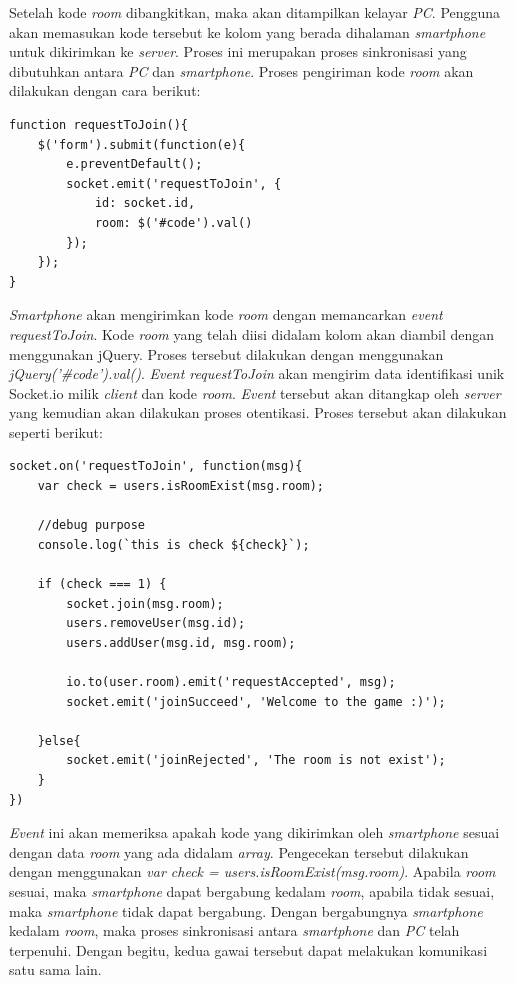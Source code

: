 \begin{enumerate}
\begin{itemize}
		Setelah kode \textit{room} dibangkitkan, maka akan ditampilkan kelayar \textit{PC}. Pengguna akan memasukan kode tersebut ke kolom yang berada dihalaman \textit{smartphone} untuk dikirimkan ke \textit{server}. Proses ini merupakan proses sinkronisasi yang dibutuhkan antara \textit{PC} dan \textit{smartphone}. Proses pengiriman kode \textit{room} akan dilakukan dengan cara berikut:
\begin{lstlisting}
function requestToJoin(){
	$('form').submit(function(e){
		e.preventDefault();
		socket.emit('requestToJoin', {
			id: socket.id,
			room: $('#code').val()
		});
	});
}
\end{lstlisting}
		\textit{Smartphone} akan mengirimkan kode \textit{room} dengan memancarkan \textit{event requestToJoin}. Kode \textit{room} yang telah diisi didalam kolom akan diambil dengan menggunakan jQuery. Proses tersebut dilakukan dengan menggunakan \textit{jQuery('\#code').val()}. \textit{Event requestToJoin} akan mengirim data identifikasi unik Socket.io milik \textit{client} dan kode \textit{room}. \textit{Event} tersebut akan ditangkap oleh \textit{server} yang kemudian akan dilakukan proses otentikasi. Proses tersebut akan dilakukan seperti berikut:
\begin{lstlisting}[caption={Proses otentikasi}, label={lst:otentikasi},captionpos=b]
socket.on('requestToJoin', function(msg){
	var check = users.isRoomExist(msg.room);

	//debug purpose
	console.log(`this is check ${check}`);

	if (check === 1) {
		socket.join(msg.room);
		users.removeUser(msg.id);
		users.addUser(msg.id, msg.room);

		io.to(user.room).emit('requestAccepted', msg);
		socket.emit('joinSucceed', 'Welcome to the game :)');

	}else{
		socket.emit('joinRejected', 'The room is not exist');
	}
})
\end{lstlisting}
		\textit{Event} ini akan memeriksa apakah kode yang dikirimkan oleh \textit{smartphone} sesuai dengan data \textit{room} yang ada didalam \textit{array}. Pengecekan tersebut dilakukan dengan menggunakan \textit{var check = users.isRoomExist(msg.room)}. Apabila \textit{room} sesuai, maka \textit{smartphone} dapat bergabung kedalam \textit{room}, apabila tidak sesuai, maka \textit{smartphone} tidak dapat bergabung. Dengan bergabungnya \textit{smartphone} kedalam \textit{room}, maka proses sinkronisasi antara \textit{smartphone} dan \textit{PC} telah terpenuhi. Dengan begitu, kedua gawai tersebut dapat melakukan komunikasi satu sama lain.
		
	\end{itemize}
\end{enumerate}
